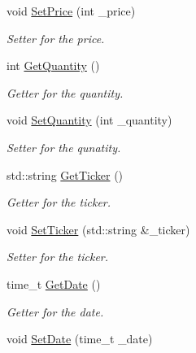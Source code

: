 \begin{DoxyCompactItemize}
void \mbox{\hyperlink{class_transaction_type_a541773963f8beb21a153508f5d221496}{Set\+Price}} (int \+\_\+price)
\begin{DoxyCompactList}\small\item\em Setter for the price. \end{DoxyCompactList}\item 
int \mbox{\hyperlink{class_transaction_type_a2b81258ca5237f8c07e2bdd43f0ffde1}{Get\+Quantity}} ()
\begin{DoxyCompactList}\small\item\em Getter for the quantity. \end{DoxyCompactList}\item 
\mbox{\label{class_transaction_type_a565c27163ec862d1bed46ca80d708621}} 
void \mbox{\hyperlink{class_transaction_type_a565c27163ec862d1bed46ca80d708621}{Set\+Quantity}} (int \+\_\+quantity)
\begin{DoxyCompactList}\small\item\em Setter for the qunatity. \end{DoxyCompactList}\item 
std\+::string \mbox{\hyperlink{class_transaction_type_a88fd57a09996e67178256cd8e76cb3e4}{Get\+Ticker}} ()
\begin{DoxyCompactList}\small\item\em Getter for the ticker. \end{DoxyCompactList}\item 
\mbox{\label{class_transaction_type_a3a98947c1e70d7eb65d1de33c9f28a40}} 
void \mbox{\hyperlink{class_transaction_type_a3a98947c1e70d7eb65d1de33c9f28a40}{Set\+Ticker}} (std\+::string \&\+\_\+ticker)
\begin{DoxyCompactList}\small\item\em Setter for the ticker. \end{DoxyCompactList}\item 
time\+\_\+t \mbox{\hyperlink{class_transaction_type_a5e4e3170dda80d69f67efd3044bb30e0}{Get\+Date}} ()
\begin{DoxyCompactList}\small\item\em Getter for the date. \end{DoxyCompactList}\item 
\mbox{\label{class_transaction_type_a6f336dd85109be759225608abcdc9676}} 
void \mbox{\hyperlink{class_transaction_type_a6f336dd85109be759225608abcdc9676}{Set\+Date}} (time\+\_\+t \+\_\+date)

\end{DoxyCompactItemize}
